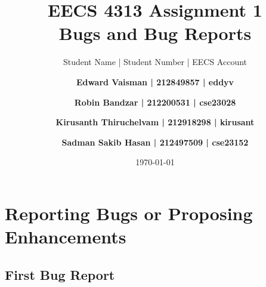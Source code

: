 \documentclass[fontsize=12pt,paper=letter,twoside]{scrartcl}
\author{Student Name | Student Number | EECS Account
\and \textbf{Edward Vaisman | 212849857 | eddyv}
\and \textbf{Robin Bandzar | 212200531 | cse23028}
\and \textbf{Kirusanth Thiruchelvam | 212918298 | kirusant}
\and \textbf{Sadman Sakib Hasan | 212497509 | cse23152}
}
\date{\today} %
\begin{document}
\title{EECS 4313 Assignment 1 \\Bugs and Bug Reports}
\maketitle

\newpage

\tableofcontents


\newpage



\section{Reporting Bugs or Proposing Enhancements}

\subsection{First Bug Report}
\end{document}
